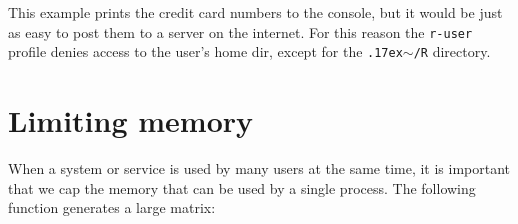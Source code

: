 \begin{appendix}
\begin{knitrout}\mycodesize
{}\color{fgcolor}\begin{kframe}
\begin{alltt}
 \hlkwb{<-} \hlstd{() \{}
     \hlkwb{<-} 
       \hlstd{(}\hlstd{,}  \hlstd{=} \hlstd{,}  \hlstd{=} \hlstd{)) \{}
         \hlstd{(}\hlopt{$} \hlopt{>} \hlstd{)}
         \hlkwb{<-} 
         \hlkwb{<-} 
         \hlkwb{<-} \hlstd{(}
         \hlstd{(} \hlopt{>} \hlstd{) \{}
            \hlstd{(}   \hlstd{=} \hlstd{),} \hlstd{)}
        \hlstd{\}}
    \hlstd{\}}
\hlstd{\}}
\end{alltt}
\end{kframe}
\end{knitrout}


This example prints the credit card numbers to the console, but it would be
just as easy to post them to a server on the internet. For this reason the
\texttt{r-user} profile denies access to the user's home dir, except for the
\texttt{{\raise.17ex\hbox{$\scriptstyle\sim$}}/R} directory.


\section{Limiting memory}

When a system or service is used by many users at the same time, it is
important that we cap the memory that can be used by a single process. The
following function generates a large matrix:

\begin{knitrout}\mycodesize
{}\color{fgcolor}\begin{kframe}
\begin{alltt}
 \hlkwb{<-} \hlstd{() \{}
     \hlkwb{<-} \hlstd{(}\hlstd{(}\hlstd{),} \hlstd{)}
\hlstd{\}}
\end{alltt}
\end{kframe}
\end{knitrout}



\end{appendix}
